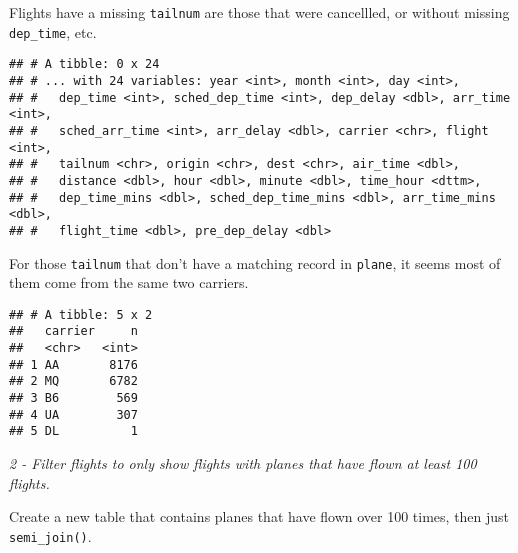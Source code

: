 \documentclass[]{article}
\newenvironment{Shaded}{\begin{snugshade}}{\end{snugshade}}
\newcommand{\KeywordTok}[1]{\textcolor[rgb]{0.13,0.29,0.53}{\textbf{#1}}}
\newcommand{\DataTypeTok}[1]{\textcolor[rgb]{0.13,0.29,0.53}{#1}}
\newcommand{\StringTok}[1]{\textcolor[rgb]{0.31,0.60,0.02}{#1}}
\newcommand{\OperatorTok}[1]{\textcolor[rgb]{0.81,0.36,0.00}{\textbf{#1}}}
\newcommand{\NormalTok}[1]{#1}
\theoremstyle{definition}
\theoremstyle{definition}
\theoremstyle{definition}
\theoremstyle{remark}
\begin{document}
Flights have a missing \texttt{tailnum} are those that were cancellled,
or without missing \texttt{dep\_time}, etc.

\begin{Shaded}
\end{Shaded}

\begin{verbatim}
## # A tibble: 0 x 24
## # ... with 24 variables: year <int>, month <int>, day <int>,
## #   dep_time <int>, sched_dep_time <int>, dep_delay <dbl>, arr_time <int>,
## #   sched_arr_time <int>, arr_delay <dbl>, carrier <chr>, flight <int>,
## #   tailnum <chr>, origin <chr>, dest <chr>, air_time <dbl>,
## #   distance <dbl>, hour <dbl>, minute <dbl>, time_hour <dttm>,
## #   dep_time_mins <dbl>, sched_dep_time_mins <dbl>, arr_time_mins <dbl>,
## #   flight_time <dbl>, pre_dep_delay <dbl>
\end{verbatim}

For those \texttt{tailnum} that don't have a matching record in
\texttt{plane}, it seems most of them come from the same two carriers.

\begin{Shaded}
\end{Shaded}

\begin{verbatim}
## # A tibble: 5 x 2
##   carrier     n
##   <chr>   <int>
## 1 AA       8176
## 2 MQ       6782
## 3 B6        569
## 4 UA        307
## 5 DL          1
\end{verbatim}

\emph{2 - Filter flights to only show flights with planes that have
flown at least 100 flights.}

Create a new table that contains planes that have flown over 100 times,
then just \texttt{semi\_join()}.
\end{document}
